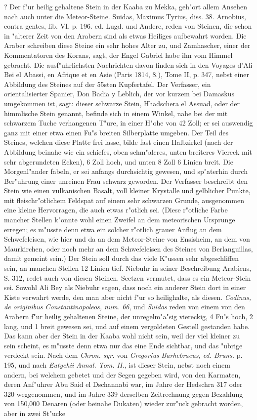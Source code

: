 \documentclass[a4paper, 11pt, oneside, polutonikogreek, german]{article}
\begin{document}
? Der f"ur heilig gehaltene Stein in der Kaaba zu Mekka, geh"ort allem Ansehen nach auch unter die Meteor-Steine. Suidas, Maximus Tyrius, diss. 38. Arnobius, contra gentes, lib. VI. p. 196. ed. Lugd. und Andere, reden von Steinen, die schon in "alterer Zeit von den Arabern sind als etwas Heiliges aufbewahrt worden. Die Araber schreiben diese Steine ein sehr hohes Alter zu, und Zamhascher, einer der Kommentatoren des Korans, sagt, der Engel Gabriel habe ihn vom Himmel gebracht. Die ausf"uhrlichsten Nachrichten davon finden sich in den Voyages d'Ali Bei el Abassi, en Afrique et en Asie (Paris 1814, 8.), Tome II, p. 347, nebst einer Abbildung des Steines auf der 55sten Kupfertafel. Der Verfasser, ein orientalisierter Spanier, Don Badia y Leblich, der vor kurzem bei Damaskus umgekommen ist, sagt: dieser schwarze Stein, Hhadschera el Assuad, oder der himmlische Stein genannt, befinde sich in einem Winkel, nahe bei der mit schwarzem Tuche verhangenen T"ure, in einer H"ohe von 42 Zoll; er sei auswendig ganz mit einer etwa einen Fu"s breiten Silberplatte umgeben. Der Teil des Steines, welchen diese Platte frei lasse, bilde fast einen Halbzirkel (nach der Abbildung beinahe wie ein schiefes, oben schm"aleres, unten breiteres Viereck mit sehr abgerundeten Ecken), 6 Zoll hoch, und unten 8 Zoll 6 Linien breit. Die Morgenl"ander fabeln, er sei anfangs durchsichtig gewesen, und sp"aterhin durch Ber"uhrung einer unreinen Frau schwarz geworden. Der Verfasser beschreibt den Stein wie einen vulkanischen Basalt, voll kleiner Krystalle und gelblicher Punkte, mit fleischr"otlichem Feldspat auf einem sehr schwarzen Grunde, ausgenommen eine kleine Hervorragen, die auch etwas r"otlich sei. (Diese r"otliche Farbe mancher Stellen k"onnte wohl einen Zweifel an dem meteorischen Ursprunge erregen; es m"usste denn etwa ein solcher r"otlich grauer Anflug an dem Schwefeleisen, wie hier und da an dem Meteor-Steine von Ensisheim, an dem von Maurkirchen, oder noch mehr an dem Schwefeleisen des Steines von Berlanguillas, damit gemeint sein.) Der Stein soll durch das viele K"ussen sehr abgeschliffen sein, an manchen Stellen 12 Linien tief. Niebuhr in seiner Beschreibung Arabiens, S. 312, redet auch von diesen Steinen. Seetzen vermutet, dass es ein Meteor-Stein sei. Sowohl Ali Bey als Niebuhr sagen, dass noch ein anderer Stein dort in einer Kiste verwahrt werde, den man aber nicht f"ur so heilighalte, als diesen. \emph{Codinus, de originibus Constantinopoleos, num. 66}, und \emph{Suidas} reden von einem von den Arabern f"ur heilig gehaltenen Steine, der unregelm"a"sig viereckig, 4 Fu"s hoch, 2 lang, und 1 breit gewesen sei, und auf einem vergoldeten Gestell gestanden habe. Das kann aber der Stein in der Kaaba wohl nicht sein, weil der viel kleiner zu sein scheint, es m"usste denn etwa nur das eine Ende sichtbar, und das "ubrige verdeckt sein. Nach dem \emph{Chron. syr.} von \emph{Gregorius Barhebraeus, ed. Bruns.} p. 195, und nach \emph{Eutychii Annal. Tom. II.}, ist dieser Stein, nebst noch einem andern, bei welchem gebetet und der Segen gegeben wird, von den Karmaten, deren Anf"uhrer Abu Said el Dschannabi war, im Jahre der Hedschra 317 oder 320 weggenommen, und im Jahre 339 derselben Zeitrechnung gegen Bezahlung von 150,000 Denaren (oder beinahe Dukaten) wieder zur"uck gebracht worden, aber in zwei St"ucke 
\end{document}
